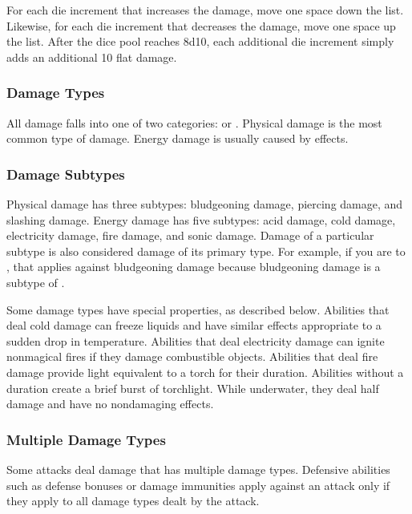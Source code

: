         For each die increment that increases the damage, move one space down the list.
        Likewise, for each die increment that decreases the damage, move one space up the list.
        After the dice pool reaches 8d10, each additional die increment simply adds an additional 10 flat damage.

        \subsubsection{Damage Types}\label{Damage Types}
            All damage falls into one of two categories:  or .
            Physical damage is the most common type of damage.
            Energy damage is usually caused by  effects.

            \subsubsection{Damage Subtypes}\label{Damage Subtypes}
                Physical damage has three subtypes: bludgeoning damage, piercing damage, and slashing damage.
                Energy damage has five subtypes: acid damage, cold damage, electricity damage, fire damage, and sonic damage.
                Damage of a particular subtype is also considered damage of its primary type.
                For example, if you are  to , that applies against bludgeoning damage because bludgeoning damage is a subtype of .

                Some damage types have special properties, as described below.
                 Abilities that deal cold damage can freeze liquids and have similar effects appropriate to a sudden drop in temperature.
                 Abilities that deal electricity damage can ignite nonmagical fires if they damage combustible objects.
                 Abilities that deal fire damage provide light equivalent to a torch for their duration.
                Abilities without a duration create a brief burst of torchlight.
                While underwater, they deal half damage and have no nondamaging effects.

            \subsubsection{Multiple Damage Types}\label{Multiple Damage Types}
                Some attacks deal damage that has multiple damage types.
                Defensive abilities such as defense bonuses or damage immunities apply against an attack only if they apply to all damage types dealt by the attack.

